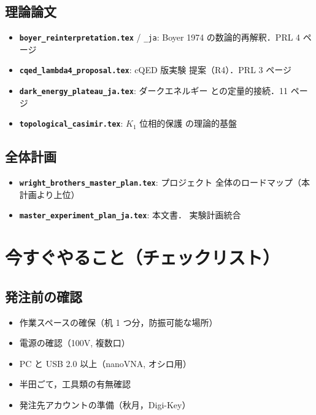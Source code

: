 \documentclass[11pt,a4paper]{article}
\begin{document}
\subsection{理論論文}

\begin{itemize}
\item \textbf{\texttt{boyer\_reinterpretation.tex}} / \texttt{\_ja}:
Boyer 1974 の数論的再解釈．PRL 4 ページ
\item \textbf{\texttt{cqed\_lambda4\_proposal.tex}}: cQED 版実験
提案（R4）．PRL 3 ページ
\item \textbf{\texttt{dark\_energy\_plateau\_ja.tex}}: ダークエネルギー
との定量的接続．11 ページ
\item \textbf{\texttt{topological\_casimir.tex}}: $K_1$ 位相的保護
の理論的基盤
\end{itemize}

\subsection{全体計画}

\begin{itemize}
\item \textbf{\texttt{wright\_brothers\_master\_plan.tex}}: プロジェクト
全体のロードマップ（本計画より上位）
\item \textbf{\texttt{master\_experiment\_plan\_ja.tex}}: 本文書．
実験計画統合
\end{itemize}

\section{今すぐやること（チェックリスト）}

\subsection{発注前の確認}

\begin{itemize}
\item[$\square$] 作業スペースの確保（机 1 つ分，防振可能な場所）
\item[$\square$] 電源の確認（100V, 複数口）
\item[$\square$] PC と USB 2.0 以上（nanoVNA, オシロ用）
\item[$\square$] 半田ごて，工具類の有無確認
\item[$\square$] 発注先アカウントの準備（秋月，Digi-Key）
\end{itemize}
\end{document}
